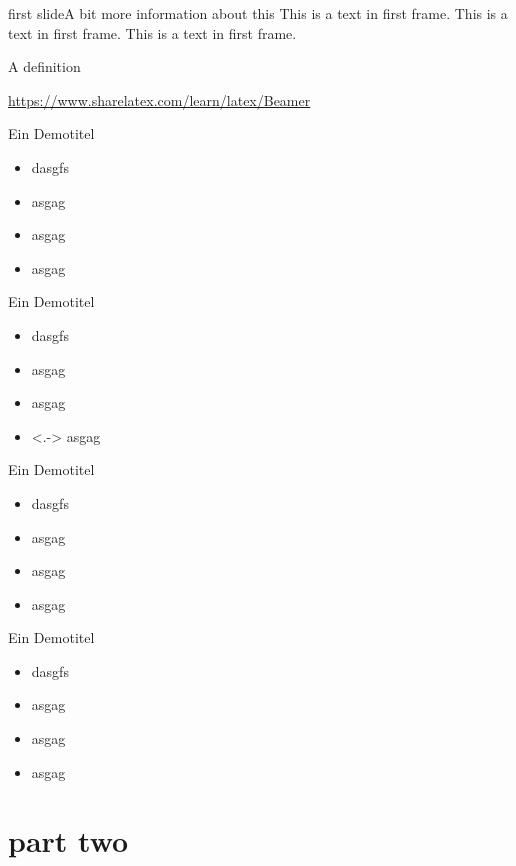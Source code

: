 \begin{frame}[c]{first slide}{A bit more information about this}
	This is a text in first frame. \pause This is a text in first frame. This is a text in first frame.
	\begin{definition}
		A definition
	\end{definition}
	\url{https://www.sharelatex.com/learn/latex/Beamer}
\end{frame}

\begin{frame}[<+->]{Ein Demotitel}{}
	\begin{itemize}
		\item<1-> dasgfs
		\item<2> asgag
		\item<3-> asgag
		\item asgag
	\end{itemize}
\end{frame}

\begin{frame}[<+->]{Ein Demotitel}{}
	\begin{itemize}
		\item dasgfs
		\item asgag
		\item asgag
		\item<.-> asgag
	\end{itemize}
\end{frame}

\begin{frame}{Ein Demotitel}{}
	\begin{itemize}
		\item<+-> dasgfs
		\item<+-> asgag
		\item<+-> asgag
		\item<+-> asgag
	\end{itemize}
\end{frame}
\begin{frame}{Ein Demotitel}{}
	\begin{itemize}[<+->]
		\item dasgfs
		\item asgag
		\item asgag
		\item asgag
	\end{itemize}
\end{frame}

\section{part two}

